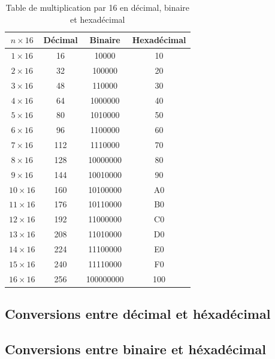 \documentclass[12pt]{article}
\begin{document}
\begin{table}[h]
    \centering
    \begin{tabular}{|c|c|c|c|}
    \hline
    \(n \times 16\) & Décimal & Binaire & Hexadécimal \\
    \hline
    \(1 \times 16\) & 16  & 10000            & 10 \\
    \hline
    \(2 \times 16\) & 32  & 100000           & 20 \\
    \hline
    \(3 \times 16\) & 48  & 110000           & 30 \\
    \hline
    \(4 \times 16\) & 64  & 1000000          & 40 \\
    \hline
    \(5 \times 16\) & 80  & 1010000          & 50 \\
    \hline
    \(6 \times 16\) & 96  & 1100000          & 60 \\
    \hline
    \(7 \times 16\) & 112 & 1110000          & 70 \\
    \hline
    \(8 \times 16\) & 128 & 10000000         & 80 \\
    \hline
    \(9 \times 16\) & 144 & 10010000         & 90 \\
    \hline
    \(10 \times 16\) & 160 & 10100000        & A0 \\
    \hline
    \(11 \times 16\) & 176 & 10110000        & B0 \\
    \hline
    \(12 \times 16\) & 192 & 11000000        & C0 \\
    \hline
    \(13 \times 16\) & 208 & 11010000        & D0 \\
    \hline
    \(14 \times 16\) & 224 & 11100000        & E0 \\
    \hline
    \(15 \times 16\) & 240 & 11110000        & F0 \\
    \hline
    \(16 \times 16\) & 256 & 100000000       & 100 \\
    \hline
    \end{tabular}
    \caption{Table de multiplication par 16 en décimal, binaire et hexadécimal}
    \label{tab:table_de_16_formats}
\end{table}


\subsection{Conversions entre décimal et héxadécimal}


\subsection{Conversions entre binaire et héxadécimal}
\end{document}

